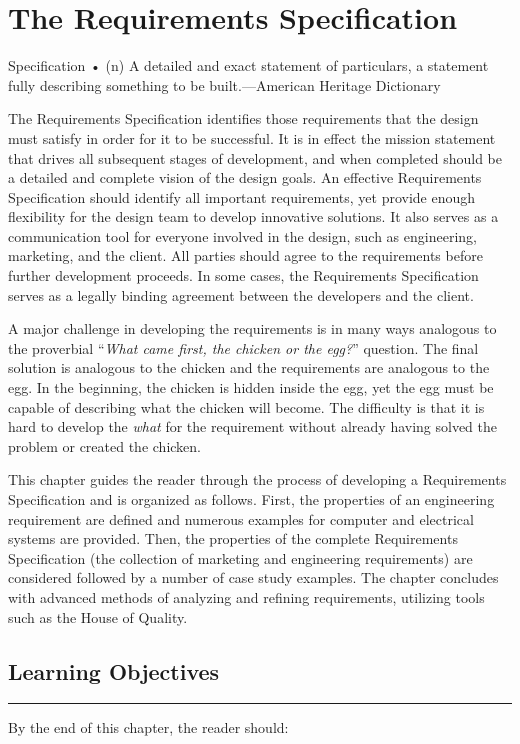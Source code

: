 \chapter{The Requirements Specification}
\graphicspath{ {./chapter03/Fig} }

Specification • (n) A detailed and exact statement of particulars, a
statement fully describing something to be built.---American Heritage
Dictionary

The Requirements Specification identifies those requirements that the
design must satisfy in order for it to be successful. It is in effect
the mission statement that drives all subsequent stages of development,
and when completed should be a detailed and complete vision of the
design goals. An effective Requirements Specification should identify
all important requirements, yet provide enough flexibility for the
design team to develop innovative solutions. It also serves as a
communication tool for everyone involved in the design, such as
engineering, marketing, and the client. All parties should agree to the
requirements before further development proceeds. In some cases, the
Requirements Specification serves as a legally binding agreement between
the developers and the client.

A major challenge in developing the requirements is in many ways
analogous to the proverbial ``\emph{What came first, the chicken or the
egg?}'' question. The final solution is analogous to the chicken and the
requirements are analogous to the egg. In the beginning, the chicken is
hidden inside the egg, yet the egg must be capable of describing what
the chicken will become. The difficulty is that it is hard to develop
the \emph{what} for the requirement without already having solved the
problem or created the chicken.

This chapter guides the reader through the process of developing a
Requirements Specification and is organized as follows. First, the
properties of an engineering requirement are defined and numerous
examples for computer and electrical systems are provided. Then, the
properties of the complete Requirements Specification (the collection of
marketing and engineering requirements) are considered followed by a
number of case study examples. The chapter concludes with advanced
methods of analyzing and refining requirements, utilizing tools such as
the House of Quality.

\section*{Learning Objectives}
\noindent\rule{\linewidth}{1pt}
By the end of this chapter, the reader should:

